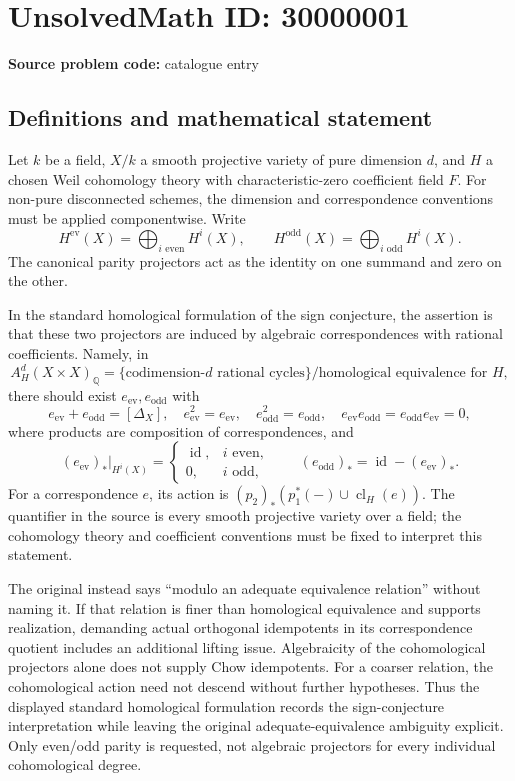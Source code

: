 \documentclass[11pt]{article}
\newcommand{\Q}{\mathbb{Q}}
\begin{document}
\section*{UnsolvedMath ID: 30000001}
\textbf{Source problem code:} catalogue entry
\subsection{Definitions and mathematical statement}
Let \(k\) be a field, \(X/k\) a smooth projective variety of pure dimension \(d\), and \(H\) a chosen Weil cohomology theory with characteristic-zero coefficient field \(F\). For non-pure disconnected schemes, the dimension and correspondence conventions must be applied componentwise. Write
\[
 H^{\mathrm{ev}}(X)=\bigoplus_{i\text{ even}}H^i(X),\qquad
 H^{\mathrm{odd}}(X)=\bigoplus_{i\text{ odd}}H^i(X).
\]
The canonical parity projectors act as the identity on one summand and zero on the other.

In the standard homological formulation of the sign conjecture, the assertion is that these two projectors are induced by algebraic correspondences with rational coefficients. Namely, in
\[
 A_H^d(X\times X)_\Q
 =\{\text{codimension-}d\text{ rational cycles}\}/\text{homological equivalence for }H,
\]
there should exist \(e_{\mathrm{ev}},e_{\mathrm{odd}}\) with
\[
 e_{\mathrm{ev}}+e_{\mathrm{odd}}=[\Delta_X],\quad
 e_{\mathrm{ev}}^2=e_{\mathrm{ev}},\quad e_{\mathrm{odd}}^2=e_{\mathrm{odd}},\quad
 e_{\mathrm{ev}}e_{\mathrm{odd}}=e_{\mathrm{odd}}e_{\mathrm{ev}}=0,
\]
where products are composition of correspondences, and
\[
 (e_{\mathrm{ev}})_*|_{H^i(X)}=
 \begin{cases}\operatorname{id},&i\text{ even},\\0,&i\text{ odd},\end{cases}
 \qquad(e_{\mathrm{odd}})_*=\operatorname{id}-(e_{\mathrm{ev}})_*.
\]
For a correspondence \(e\), its action is \((p_2)_*(p_1^*(-)\cup\operatorname{cl}_H(e))\). The quantifier in the source is every smooth projective variety over a field; the cohomology theory and coefficient conventions must be fixed to interpret this statement.

The original instead says ``modulo an adequate equivalence relation'' without naming it. If that relation is finer than homological equivalence and supports realization, demanding actual orthogonal idempotents in its correspondence quotient includes an additional lifting issue. Algebraicity of the cohomological projectors alone does not supply Chow idempotents. For a coarser relation, the cohomological action need not descend without further hypotheses. Thus the displayed standard homological formulation records the sign-conjecture interpretation while leaving the original adequate-equivalence ambiguity explicit. Only even/odd parity is requested, not algebraic projectors for every individual cohomological degree.
\end{document}
